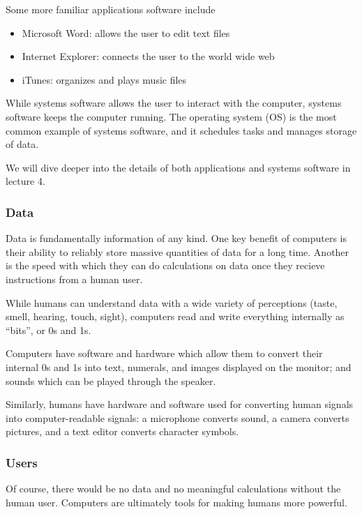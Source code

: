 \documentclass[letterpaper,10pt,english,openany,oneside]{sphinxmanual}
\begin{document}
Some more familiar applications software include
\begin{itemize}
\item {} 
Microsoft Word: allows the user to edit text files

\item {} 
Internet Explorer: connects the user to the world wide web

\item {} 
iTunes: organizes and plays music files

\end{itemize}

While systems software allows the user to interact with the computer, systems software keeps the computer running. The operating system (OS) is the most common example of systems software, and it schedules tasks and manages storage of data.

We will dive deeper into the details of both applications and systems software in lecture 4.


\subsubsection{Data}
\label{\detokenize{introduction:data}}
Data is fundamentally information of any kind. One key benefit of computers is their ability to reliably store massive quantities of data for a long time. Another is the speed with which they can do calculations on data once they recieve instructions from a human user.

While humans can understand data with a wide variety of perceptions (taste, smell, hearing, touch, sight), computers read and write everything internally as “bits”, or 0s and 1s.

Computers have software and hardware which allow them to convert their internal 0s and 1s into text, numerals, and images displayed on the monitor; and sounds which can be played through the speaker.

Similarly, humans have hardware and software used for converting human signals into computer-readable signals: a microphone converts sound, a camera converts pictures, and a text editor converts character symbols.


\subsubsection{Users}
\label{\detokenize{introduction:users}}
Of course, there would be no data and no meaningful calculations without the human user. Computers are ultimately tools for making humans more powerful.
\end{document}
